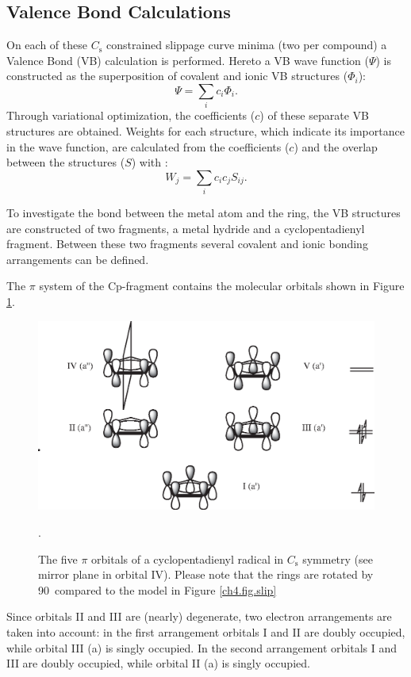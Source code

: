 \subsection{Valence Bond Calculations}

On each of these $C_\mathrm{s}$ constrained slippage curve minima (two per compound) a Valence Bond (VB) calculation is performed. Hereto a VB wave function ($\Psi$) is constructed as the superposition of covalent and ionic VB structures ($\Phi_i$):
\begin{equation}
\Psi = \sum_{i} c_{i}\Phi{_i}.
\label{ch4.eq.psi}
\end{equation}
Through variational optimization, the coefficients ($c$) of these separate VB structures are obtained.
Weights for each structure, which indicate its importance in the wave function, are calculated from the coefficients ($c$) and the overlap between the structures ($S$) with \cite{coulson}:
\begin{equation}
W_{j}=\sum_{i} c_{i}c_{j}S_{ij}.
\label{ch4.eq.weight}
\end{equation}

To investigate the bond between the metal atom and the ring, the VB structures are constructed of two fragments, a metal hydride and a cyclopentadienyl fragment.  Between these two fragments several covalent and ionic bonding arrangements can be defined.

The $\pi$ system of the Cp-fragment contains the molecular orbitals shown in Figure \ref{ch4.fig.cporbs}.
\begin{figure}[htbp]
\center
\includegraphics[scale=0.7]{cyclopentadienyl/figures/cp-orbitals.eps}
\caption{The five $\pi$ orbitals of a cyclopentadienyl radical in $C_\mathrm{s}$ symmetry (see mirror plane in orbital IV). Please note that the rings are rotated by 90\degrees\ compared to the model in Figure \ref{ch4.fig.slip}}.
\label{ch4.fig.cporbs}
\end{figure}
Since orbitals II and III are (nearly) degenerate, two electron arrangements are taken into account: in the first arrangement orbitals I and II are doubly occupied, while orbital III (a\textquotesingle) is singly occupied. In the second arrangement orbitals I and III are doubly occupied, while orbital II (a\textquotesingle\textquotesingle) is singly occupied. 

